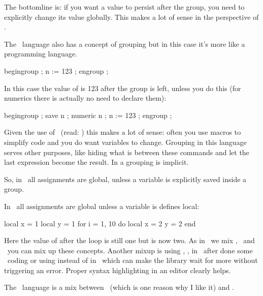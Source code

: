 \starttyping
\bgroup
\endgroup
\stoptyping

The bottomline is: if you want a value to persist after the group, you need to
explicitly change its value globally. This makes a lot of sense in the perspective
of \TEX.

\stopsection

\startsection[title=\METAPOST]

The \METAPOST\ language also has a concept of grouping but in this case it's more like a
programming language.

\starttyping
begingroup ;
    n := 123 ;
engroup ;
\stoptyping

In this case the value of  is 123 after the group is left, unless you do
this (for numerics there is actually no need to declare them):

\starttyping
begingroup ;
    save n ; numeric n ; n := 123 ;
engroup ;
\stoptyping

Given the use of \METAPOST\ (read: \METAFONT) this makes a lot of sense: often
you use macros to simplify code and you do want variables to change. Grouping in
this language serves other purposes, like hiding what is between these commands
and let the last expression become the result. In a  grouping is
implicit.

So, in \METAPOST\ all assignments are global, unless a variable is explicitly
saved inside a group.

\stopsection

\startsection[title=\LUA]

In \LUA\ all assignments are global unless a variable is defines local:

\starttyping
local x = 1
local y = 1
for i = 1, 10 do
    local x = 2
    y = 2
end
\stoptyping

Here the value of  after the loop is still one but  is now two.
As in \LUATEX\ we mix \TEX, \METAPOST\ and \LUA\ you can mix up these concepts.
Another mixup is using \type {:=}, ,  in \LUA\ after done
some \METAPOST\ coding or using  instead of  in
\METAPOST\ which can make the library wait for more without triggering an error.
Proper syntax highlighting in an editor clearly helps.

\stopsection

\startsection[title=\CCODE]

The \LUA\ language is a mix between \PASCAL\ (which is one reason why I like it)
and \CCODE.

